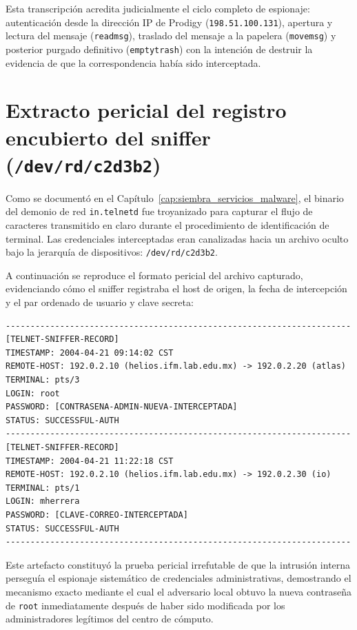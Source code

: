 Esta transcripción acredita judicialmente el ciclo completo de espionaje: autenticación desde la dirección IP de Prodigy (\texttt{198.51.100.131}), apertura y lectura del mensaje (\texttt{readmsg}), traslado del mensaje a la papelera (\texttt{movemsg}) y posterior purgado definitivo (\texttt{emptytrash}) con la intención de destruir la evidencia de que la correspondencia había sido interceptada.

\section{Extracto pericial del registro encubierto del sniffer (\texttt{/dev/rd/c2d3b2})}

Como se documentó en el Capítulo~\ref{cap:siembra_servicios_malware}, el binario del demonio de red \texttt{in.telnetd} fue troyanizado para capturar el flujo de caracteres transmitido en claro durante el procedimiento de identificación de terminal. Las credenciales interceptadas eran canalizadas hacia un archivo oculto bajo la jerarquía de dispositivos: \texttt{/dev/rd/c2d3b2}.

A continuación se reproduce el formato pericial del archivo capturado, evidenciando cómo el sniffer registraba el host de origen, la fecha de intercepción y el par ordenado de usuario y clave secreta:

\begin{lstlisting}[style=terminal]
----------------------------------------------------------------------
[TELNET-SNIFFER-RECORD]
TIMESTAMP: 2004-04-21 09:14:02 CST
REMOTE-HOST: 192.0.2.10 (helios.ifm.lab.edu.mx) -> 192.0.2.20 (atlas)
TERMINAL: pts/3
LOGIN: root
PASSWORD: [CONTRASENA-ADMIN-NUEVA-INTERCEPTADA]
STATUS: SUCCESSFUL-AUTH
----------------------------------------------------------------------
[TELNET-SNIFFER-RECORD]
TIMESTAMP: 2004-04-21 11:22:18 CST
REMOTE-HOST: 192.0.2.10 (helios.ifm.lab.edu.mx) -> 192.0.2.30 (io)
TERMINAL: pts/1
LOGIN: mherrera
PASSWORD: [CLAVE-CORREO-INTERCEPTADA]
STATUS: SUCCESSFUL-AUTH
----------------------------------------------------------------------
\end{lstlisting}

Este artefacto constituyó la prueba pericial irrefutable de que la intrusión interna perseguía el espionaje sistemático de credenciales administrativas, demostrando el mecanismo exacto mediante el cual el adversario local obtuvo la nueva contraseña de \texttt{root} inmediatamente después de haber sido modificada por los administradores legítimos del centro de cómputo.
